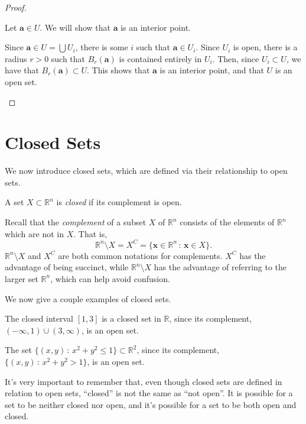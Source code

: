 \documentclass{ximera}
\begin{document}
\begin{proof}
\begin{unfoldable}
Let $\mathbf{a}\in U$. We will show that $\mathbf{a}$ is an interior point.

Since $\mathbf{a}\in U=\bigcup U_i$, there is some $i$ such that $\mathbf{a}\in U_i$. Since $U_i$ is open, there is a radius $r>0$ such that $B_r(\mathbf{a})$ is contained entirely in $U_i$. Then, since $U_i \subset U$, we have that $B_r(\mathbf{a})\subset U$. This shows that $\mathbf{a}$ is an interior point, and that $U$ is an open set.

\end{unfoldable}
\end{proof}

\section{Closed Sets}

We now introduce closed sets, which are defined via their relationship to open sets.

\begin{definition}
A set $X\subset \mathbb{R}^n$ is \emph{closed} if its complement is open.
\end{definition}

Recall that the \emph{complement} of a subset $X$ of $\mathbb{R}^n$ consists of the elements of $\mathbb{R}^n$ which are not in $X$. That is,
\[
\mathbb{R}^n\setminus X = X^C = \{\mathbf{x}\in\mathbb{R}^n\,:\,\mathbf{x}\in X\}.
\]
$\mathbb{R}^n\setminus X$ and $X^C$ are both common notations for complements. $X^C$ has the advantage of being succinct, while $\mathbb{R}^n\setminus X$ has the advantage of referring to the larger set $\mathbb{R}^n$, which can help avoid confusion.

We now give a couple examples of closed sets.

\begin{example}
\begin{foldable}
The closed interval $[1,3]$ is a closed set in $\mathbb{R}$, since its complement, $(-\infty, 1)\cup (3,\infty)$, is an open set.

The set $\{(x,y)\,:\,x^2+y^2\leq 1\}\subset \mathbb{R}^2$, since its complement, $\{(x,y)\,:\,x^2+y^2> 1\}$, is an open set.
\end{foldable}
\end{example}

It's very important to remember that, even though closed sets are defined in relation to open sets, {\color{red}``closed'' is not the same as ``not open''}. It is possible for a set to be neither closed nor open, and it's possible for a set to be both open and closed.
\end{document}
